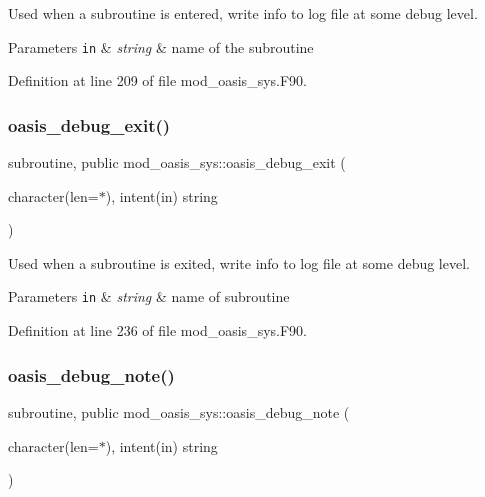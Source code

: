 Used when a subroutine is entered, write info to log file at some debug level. 


\begin{DoxyParams}[1]{Parameters}
\mbox{\tt in}  & {\em string} & name of the subroutine \\
\hline
\end{DoxyParams}


Definition at line 209 of file mod\+\_\+oasis\+\_\+sys.\+F90.

\mbox{\label{namespacemod__oasis__sys_a349f71cba2df935179d78f3858992c83}} 
\subsubsection{\texorpdfstring{oasis\+\_\+debug\+\_\+exit()}{oasis\_debug\_exit()}}
{\footnotesize\ttfamily subroutine, public mod\+\_\+oasis\+\_\+sys\+::oasis\+\_\+debug\+\_\+exit (\begin{DoxyParamCaption}\item[{character(len=$\ast$), intent(in)}]{string }\end{DoxyParamCaption})}



Used when a subroutine is exited, write info to log file at some debug level. 


\begin{DoxyParams}[1]{Parameters}
\mbox{\tt in}  & {\em string} & name of subroutine \\
\hline
\end{DoxyParams}


Definition at line 236 of file mod\+\_\+oasis\+\_\+sys.\+F90.

\mbox{\label{namespacemod__oasis__sys_a8e488f6a9a829762324519c6dd493912}} 
\subsubsection{\texorpdfstring{oasis\+\_\+debug\+\_\+note()}{oasis\_debug\_note()}}
{\footnotesize\ttfamily subroutine, public mod\+\_\+oasis\+\_\+sys\+::oasis\+\_\+debug\+\_\+note (\begin{DoxyParamCaption}\item[{character(len=$\ast$), intent(in)}]{string }\end{DoxyParamCaption})}



